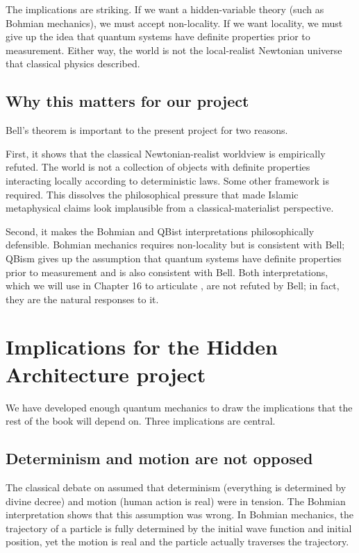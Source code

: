 The implications are striking. If we want a hidden-variable theory
(such as Bohmian mechanics), we must accept non-locality. If we
want locality, we must give up the idea that quantum systems have
definite properties prior to measurement. Either way, the world is
not the local-realist Newtonian universe that classical physics
described.

\subsection{Why this matters for our project}

Bell's theorem is important to the present project for two reasons.

First, it shows that the classical Newtonian-realist worldview is
empirically refuted. The world is not a collection of objects with
definite properties interacting locally according to deterministic
laws. Some other framework is required. This dissolves the
philosophical pressure that made Islamic metaphysical claims look
implausible from a classical-materialist perspective.

Second, it makes the Bohmian and QBist interpretations
philosophically defensible. Bohmian mechanics requires non-locality
but is consistent with Bell; QBism gives up the assumption that
quantum systems have definite properties prior to measurement and
is also consistent with Bell. Both interpretations, which we will
use in Chapter 16 to articulate , are not refuted by
Bell; in fact, they are the natural responses to it.

\section{Implications for the Hidden Architecture project}
\label{sec:qm-implications}

We have developed enough quantum mechanics to draw the implications
that the rest of the book will depend on. Three implications are
central.

\subsection{Determinism and motion are not opposed}

The classical  debate on  assumed that
determinism (everything is determined by divine decree) and motion
(human action is real) were in tension. The Bohmian interpretation
shows that this assumption was wrong. In Bohmian mechanics, the
trajectory of a particle is fully determined by the initial wave
function and initial position, yet the motion is real and the
particle actually traverses the trajectory.

